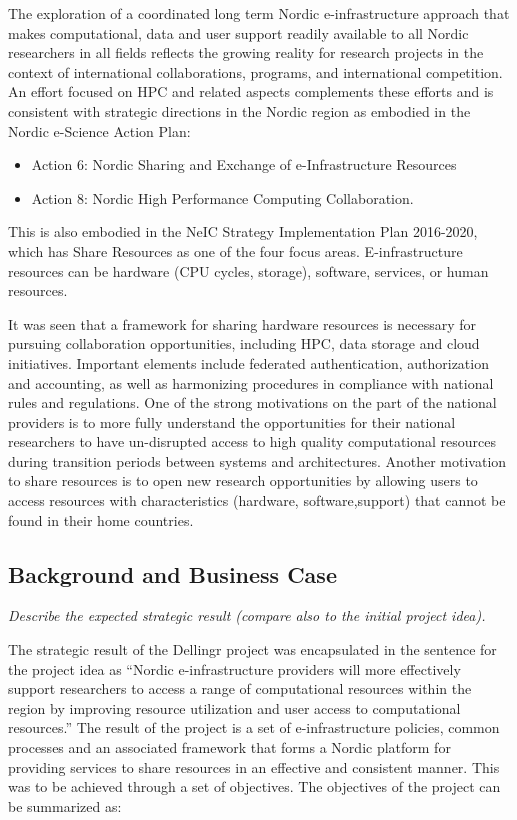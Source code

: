\documentclass{article}
\newcommand{\dell}{Dellingr\xspace}
\begin{document}
The exploration of a coordinated long term Nordic e-infrastructure approach that makes computational, data and user support readily available to all Nordic researchers in all fields reflects the growing reality for research projects in the context of international collaborations, programs, and international competition.
An effort focused on HPC and related aspects complements these efforts and is consistent with strategic directions in the Nordic region as embodied in the Nordic e-Science Action Plan:
\begin{itemize}
\item Action 6: Nordic Sharing and Exchange of e-Infrastructure Resources
\item Action 8: Nordic High Performance Computing Collaboration.
\end{itemize}

This is also embodied in the NeIC Strategy Implementation Plan 2016-2020, which has Share Resources as one of the four focus areas. E-infrastructure resources can be hardware (CPU cycles, storage), software, services, or human resources. 

It was seen that a framework for sharing hardware resources is necessary for pursuing collaboration opportunities, including HPC, data storage and cloud initiatives. 
Important elements include federated authentication, authorization and accounting, as well as harmonizing procedures in compliance with national rules and regulations. 
One of the strong motivations on the part of the national providers is to more fully understand the opportunities for their national researchers to have un-disrupted access to high quality computational resources during transition periods between systems and architectures. 
Another motivation to share resources is to open new research opportunities by allowing users to access resources with characteristics (hardware, software,support) that cannot be found in their home countries.


\subsection{Background and Business Case}
{\it Describe the expected strategic result (compare also to the initial project idea).}
\label{ssec:background}

The strategic result of the \dell project was encapsulated 
in the sentence for the project idea as ``Nordic e-infrastructure providers will more effectively support researchers to access a range of computational
resources within the region by improving resource utilization and user access to computational resources.''
The result of the project is a set of e-infrastructure policies, common processes and an associated framework that forms a Nordic platform for providing services to share resources in an effective and consistent manner.
This was to be achieved through a set of objectives.
The objectives of the project can be summarized as: \\
\end{document}
